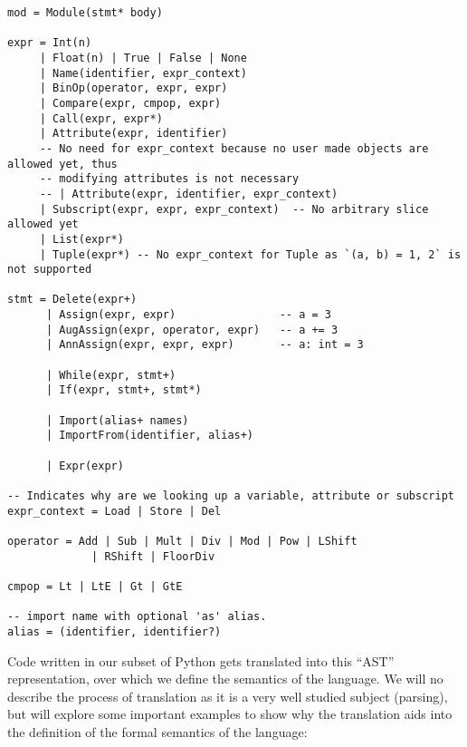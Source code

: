 \begin{verbatim}
mod = Module(stmt* body)

expr = Int(n)
     | Float(n) | True | False | None
     | Name(identifier, expr_context)
     | BinOp(operator, expr, expr)
     | Compare(expr, cmpop, expr)
     | Call(expr, expr*)
     | Attribute(expr, identifier)
     -- No need for expr_context because no user made objects are allowed yet, thus
     -- modifying attributes is not necessary
     -- | Attribute(expr, identifier, expr_context)
     | Subscript(expr, expr, expr_context)  -- No arbitrary slice allowed yet
     | List(expr*)
     | Tuple(expr*) -- No expr_context for Tuple as `(a, b) = 1, 2` is not supported

stmt = Delete(expr+)
      | Assign(expr, expr)                -- a = 3
      | AugAssign(expr, operator, expr)   -- a += 3
      | AnnAssign(expr, expr, expr)       -- a: int = 3

      | While(expr, stmt+)
      | If(expr, stmt+, stmt*)

      | Import(alias+ names)
      | ImportFrom(identifier, alias+)

      | Expr(expr)

-- Indicates why are we looking up a variable, attribute or subscript
expr_context = Load | Store | Del

operator = Add | Sub | Mult | Div | Mod | Pow | LShift
             | RShift | FloorDiv

cmpop = Lt | LtE | Gt | GtE

-- import name with optional 'as' alias.
alias = (identifier, identifier?)
\end{verbatim}

Code written in our subset of Python gets translated into this
\enquote{AST} representation, over which we define the semantics of the
language. We will no describe the process of translation as it is a very
well studied subject (parsing), but will explore some important examples
to show why the translation aids into the definition of the formal
semantics of the language:

